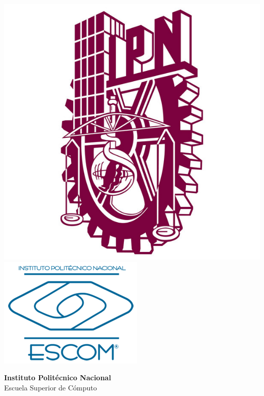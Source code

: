 \thispagestyle{empty}
\begin{center}
    \includegraphics[scale=0.8]{Portada/figuras/ipn-logo.jpg}
    \includegraphics[scale=0.55]{Portada/figuras/logo.png}\\
    \vspace{1cm}
    \begin{large}
        \textbf{Instituto Politécnico Nacional}\\
        \vspace{0.3cm}
        Escuela Superior de Cómputo\\
        \vspace{0.3cm}
        \vspace{2cm}
    \end{large}
    \begin{large}
        \textbf{\MakeUppercase{\newtitle}}\\

\end{large}
\end{center}
